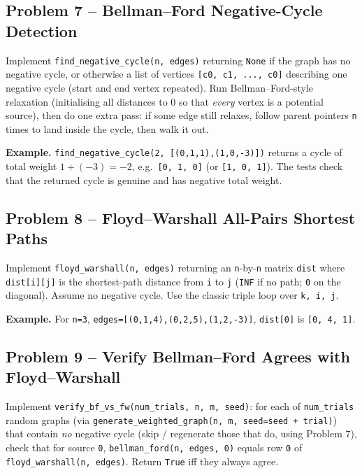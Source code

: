 \documentclass[11pt]{article}
\begin{document}
\subsection*{Problem 7 -- Bellman--Ford Negative-Cycle Detection}

Implement \texttt{find\_negative\_cycle(n, edges)} returning \texttt{None} if the graph has
no negative cycle, or otherwise a list of vertices \texttt{[c0, c1, ..., c0]} describing one
negative cycle (start and end vertex repeated). Run Bellman--Ford-style relaxation
(initialising all distances to $0$ so that \emph{every} vertex is a potential source), then
do one extra pass: if some edge still relaxes, follow parent pointers \texttt{n} times to
land inside the cycle, then walk it out.

\textbf{Example.} \texttt{find\_negative\_cycle(2, [(0,1,1),(1,0,-3)])} returns a cycle of
total weight $1 + (-3) = -2$, e.g.\ \texttt{[0, 1, 0]} (or \texttt{[1, 0, 1]}). The tests
check that the returned cycle is genuine and has negative total weight.

\subsection*{Problem 8 -- Floyd--Warshall All-Pairs Shortest Paths}

Implement \texttt{floyd\_warshall(n, edges)} returning an \texttt{n}-by-\texttt{n} matrix
\texttt{dist} where \texttt{dist[i][j]} is the shortest-path distance from \texttt{i} to
\texttt{j} (\texttt{INF} if no path; \texttt{0} on the diagonal). Assume no negative cycle.
Use the classic triple loop over \texttt{k, i, j}.

\textbf{Example.} For \texttt{n=3}, \texttt{edges=[(0,1,4),(0,2,5),(1,2,-3)]},
\texttt{dist[0]} is \texttt{[0, 4, 1]}.

\subsection*{Problem 9 -- Verify Bellman--Ford Agrees with Floyd--Warshall}

Implement \texttt{verify\_bf\_vs\_fw(num\_trials, n, m, seed)}: for each of
\texttt{num\_trials} random graphs (via \texttt{generate\_weighted\_graph(n, m, seed=seed +
trial)}) that contain \emph{no} negative cycle (skip / regenerate those that do, using
Problem 7), check that for source \texttt{0}, \texttt{bellman\_ford(n, edges, 0)} equals row
\texttt{0} of \texttt{floyd\_warshall(n, edges)}. Return \texttt{True} iff they always agree.
\end{document}

